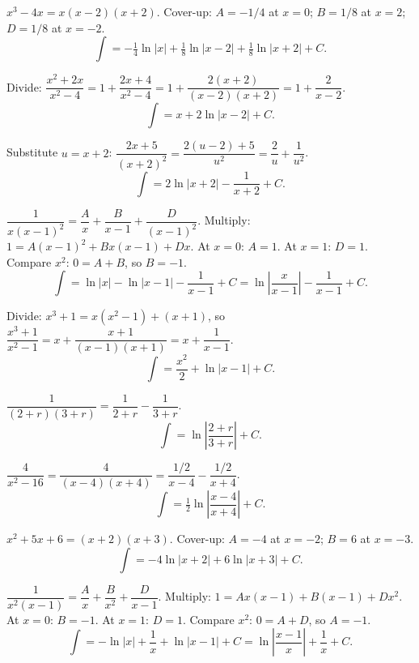 \begin{solutions}
  \item $x^{3}-4x=x(x-2)(x+2)$. Cover-up: $A=-1/4$ at $x=0$; $B=1/8$ at
        $x=2$; $D=1/8$ at $x=-2$.
        \[
          \int = -\tfrac14\ln|x|+\tfrac18\ln|x-2|+\tfrac18\ln|x+2|+C .
        \]

  \item Divide: $\dfrac{x^{2}+2x}{x^{2}-4}=1+\dfrac{2x+4}{x^{2}-4}
        =1+\dfrac{2(x+2)}{(x-2)(x+2)}=1+\dfrac{2}{x-2}$.
        \[
          \int = x+2\ln|x-2|+C .
        \]

  \item Substitute $u=x+2$: $\dfrac{2x+5}{(x+2)^{2}}
        =\dfrac{2(u-2)+5}{u^{2}}=\dfrac{2}{u}+\dfrac{1}{u^{2}}$.
        \[
          \int = 2\ln|x+2|-\frac{1}{x+2}+C .
        \]

  \item $\dfrac{1}{x(x-1)^{2}}=\dfrac{A}{x}+\dfrac{B}{x-1}
        +\dfrac{D}{(x-1)^{2}}$. Multiply: $1=A(x-1)^{2}+Bx(x-1)+Dx$.
        At $x=0$: $A=1$. At $x=1$: $D=1$. Compare $x^{2}$: $0=A+B$, so
        $B=-1$.
        \[
          \int = \ln|x|-\ln|x-1|-\frac{1}{x-1}+C
               = \ln\left|\frac{x}{x-1}\right|-\frac{1}{x-1}+C .
        \]

  \item Divide: $x^{3}+1=x(x^{2}-1)+(x+1)$, so
        $\dfrac{x^{3}+1}{x^{2}-1}=x+\dfrac{x+1}{(x-1)(x+1)}
        =x+\dfrac{1}{x-1}$.
        \[
          \int = \frac{x^{2}}{2}+\ln|x-1|+C .
        \]

  \item $\dfrac{1}{(2+r)(3+r)}=\dfrac{1}{2+r}-\dfrac{1}{3+r}$.
        \[
          \int = \ln\left|\frac{2+r}{3+r}\right|+C .
        \]

  \item $\dfrac{4}{x^{2}-16}=\dfrac{4}{(x-4)(x+4)}
        =\dfrac{1/2}{x-4}-\dfrac{1/2}{x+4}$.
        \[
          \int = \tfrac12\ln\left|\frac{x-4}{x+4}\right|+C .
        \]

  \item $x^{2}+5x+6=(x+2)(x+3)$. Cover-up: $A=-4$ at $x=-2$; $B=6$ at
        $x=-3$.
        \[
          \int = -4\ln|x+2|+6\ln|x+3|+C .
        \]

  \item $\dfrac{1}{x^{2}(x-1)}=\dfrac{A}{x}+\dfrac{B}{x^{2}}+\dfrac{D}{x-1}$.
        Multiply: $1=Ax(x-1)+B(x-1)+Dx^{2}$. At $x=0$: $B=-1$. At $x=1$:
        $D=1$. Compare $x^{2}$: $0=A+D$, so $A=-1$.
        \[
          \int = -\ln|x|+\frac1x+\ln|x-1|+C
               = \ln\left|\frac{x-1}{x}\right|+\frac1x+C .
        \]
\end{solutions}
